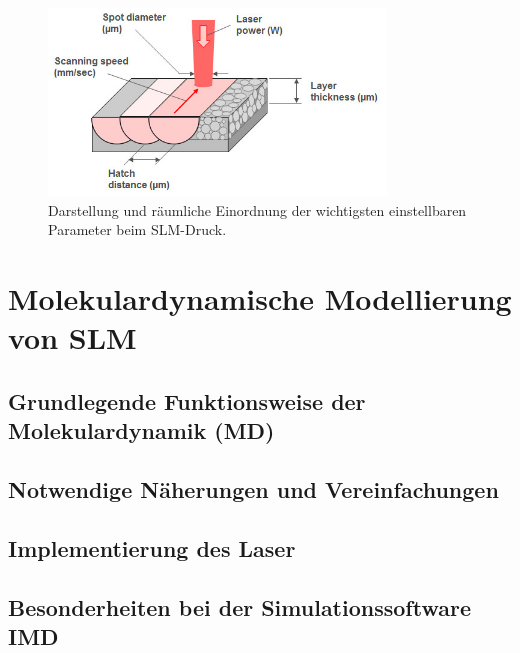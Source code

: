 		\begin{figure}[ht]
			\centering
			\includegraphics[width=0.8\textwidth]{chapter/main/img/slm_parameters.jpg}
			\caption{Darstellung und räumliche Einordnung der wichtigsten einstellbaren Parameter
			beim SLM-Druck. \cite{saunders2017x}}
			\label{fig:slm_parameters}
		\end{figure}



\section{Molekulardynamische Modellierung von SLM}
	\subsection{Grundlegende Funktionsweise der Molekulardynamik (MD)}
	\subsection{Notwendige Näherungen und Vereinfachungen}
	\subsection{Implementierung des Laser}
	\subsection{Besonderheiten bei der Simulationssoftware IMD}
